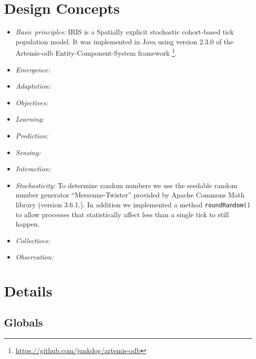 \documentclass[a4paper, 11pt]{scrartcl}
\newcommand{\inlinecode}[1]{\texttt{\small #1}}
\begin{document}
\newpage
\section{Design Concepts}\label{design_concepts}

\begin{itemize}

\item \emph{Basic principles:}
IRIS is a Spatially explicit stochastic cohort-based tick population model. It was implemented in Java using version 2.3.0 of the Artemis-odb Entity-Component-System framework \footnote{\url{https://github.com/junkdog/artemis-odb}}.

\item \emph{Emergence:}

\item \emph{Adaptation:}

\item \emph{Objectives:}

\item \emph{Learning:}

\item \emph{Prediction:}

\item \emph{Sensing:}

\item \emph{Interaction:}

\item \emph{Stochasticity:}
To determine random numbers we use the seedable random number generator ``Mersenne-Twister'' provided by Apache Commons Math library (version 3.6.1.). In addition we implemented a method \inlinecode{roundRandom()} to allow processes that statistically affect less than a single tick to still happen.

\item \emph{Collectives:}

\item \emph{Observation:}

\end{itemize}


\newpage


\section{Details}

\subsection{Globals}
\end{document}
